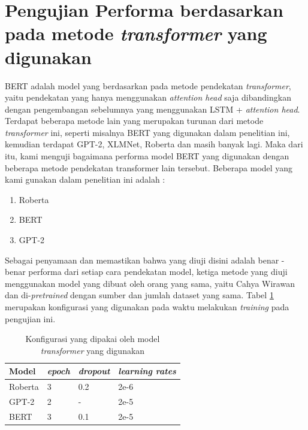\section{Pengujian Performa berdasarkan pada metode \textit{transformer} yang digunakan}

BERT adalah model yang berdasarkan pada metode pendekatan \textit{transformer}, yaitu pendekatan yang hanya menggunakan \textit{attention head} saja dibandingkan dengan pengembangan sebelumnya yang menggunakan LSTM + \textit{attention head}. Terdapat beberapa metode lain yang merupakan turunan dari metode \textit{transformer} ini, seperti misalnya BERT yang digunakan dalam penelitian ini, kemudian terdapat GPT-2, XLMNet, Roberta dan masih banyak lagi. Maka dari itu, kami menguji bagaimana performa model BERT yang digunakan dengan beberapa metode pendekatan transformer lain tersebut. Beberapa model yang kami gunakan dalam penelitian ini adalah :

\begin{enumerate}[nolistsep]
    \item Roberta
    \item BERT
    \item GPT-2
\end{enumerate}

Sebagai penyamaan dan memastikan bahwa yang diuji disini adalah benar - benar performa dari setiap cara pendekatan model, ketiga metode yang diuji menggunakan model yang dibuat oleh orang yang sama, yaitu Cahya Wirawan dan di-\textit{pretrained} dengan sumber dan jumlah dataset yang sama. Tabel \ref{tab: transformer_config} merupakan konfigurasi yang digunakan pada waktu melakukan \textit{training} pada pengujian ini.

\begin{table}[h]
    \centering
    \caption{Konfigurasi yang dipakai oleh model \textit{transformer} yang digunakan}
    \label{tab: transformer_config}
    \begin{tabular}{|l|l|l|l|}
        \hline
        \textbf{Model} & \textit{\textbf{epoch}} & \textit{\textbf{dropout}} & \textit{\textbf{learning rates}} \\ \hline
        Roberta        & 3                       & 0.2                       & 2e-6                             \\ \hline
        GPT-2          & 2                       & -                         & 2e-5                             \\ \hline
        BERT           & 3                       & 0.1                       & 2e-5                             \\ \hline
    \end{tabular}
\end{table}

